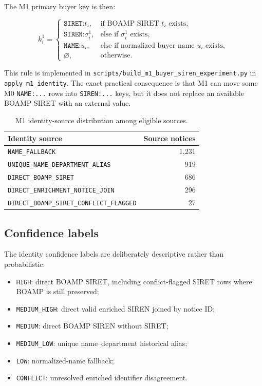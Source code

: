 \documentclass[11pt]{article}
\begin{document}
The M1 primary buyer key is then:

\[
k_i^{1} =
\begin{cases}
\texttt{SIRET:}t_i, & \text{if BOAMP SIRET } t_i \text{ exists},\\
\texttt{SIREN:}\sigma_i^{1}, & \text{else if } \sigma_i^{1} \text{ exists},\\
\texttt{NAME:}u_i, & \text{else if normalized buyer name } u_i \text{ exists},\\
\varnothing, & \text{otherwise.}
\end{cases}
\]

This rule is implemented in
\texttt{scripts/build\_m1\_buyer\_siren\_experiment.py} in
\texttt{apply\_m1\_identity}. The exact practical consequence is that M1
can move some M0 \texttt{NAME:...} rows into \texttt{SIREN:...} keys, but
it does not replace an available BOAMP SIRET with an external value.

\begin{table}[h]
\centering
\caption{M1 identity-source distribution among eligible sources.}
\begin{tabular}{lr}
\toprule
Identity source & Source notices\\
\midrule
\texttt{NAME\_FALLBACK} & 1,231\\
\texttt{UNIQUE\_NAME\_DEPARTMENT\_ALIAS} & 919\\
\texttt{DIRECT\_BOAMP\_SIRET} & 686\\
\texttt{DIRECT\_ENRICHMENT\_NOTICE\_JOIN} & 296\\
\texttt{DIRECT\_BOAMP\_SIRET\_CONFLICT\_FLAGGED} & 27\\
\bottomrule
\end{tabular}
\end{table}

\subsection{Confidence labels}

The identity confidence labels are deliberately descriptive rather than
probabilistic:

\begin{itemize}
  \item \texttt{HIGH}: direct BOAMP SIRET, including conflict-flagged SIRET
        rows where BOAMP is still preserved;
  \item \texttt{MEDIUM\_HIGH}: direct valid enriched SIREN joined by notice ID;
  \item \texttt{MEDIUM}: direct BOAMP SIREN without SIRET;
  \item \texttt{MEDIUM\_LOW}: unique name--department historical alias;
  \item \texttt{LOW}: normalized-name fallback;
  \item \texttt{CONFLICT}: unresolved enriched identifier disagreement.
\end{itemize}
\end{document}
